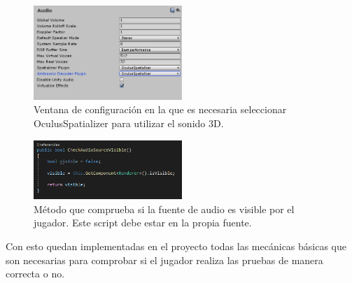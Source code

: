 \begin{figure}
  \centering
    \includegraphics[width=0.5\textwidth]{04.Desarrollo/02.Entrega2/02.Iteracion2_2/00.Figuras/10.audio_spatializer.png}
    \caption{Ventana de configuración en la que es necesaria seleccionar OculusSpatializer para utilizar el sonido 3D.}
    \label{fig:E2_audioSpatializer}
\end{figure}

\begin{figure}
  \centering
    \includegraphics[width=0.5\textwidth]{04.Desarrollo/02.Entrega2/02.Iteracion2_2/00.Figuras/11.audio_visible_script.png}
    \caption{Método que comprueba si la fuente de audio es visible por el jugador. Este script debe estar en la propia fuente.}
    \label{fig:E2_audioVisible}
\end{figure}

Con esto quedan implementadas en el proyecto todas las mecánicas básicas que son necesarias para comprobar si el jugador realiza las pruebas de manera correcta o no.

